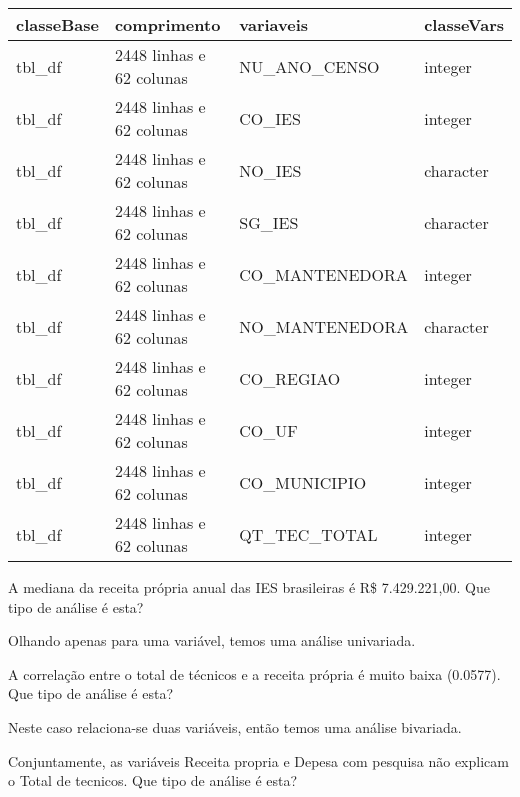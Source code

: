 \documentclass[12pt,]{style/krantz}
\theoremstyle{definition}
\theoremstyle{definition}
\theoremstyle{definition}
\theoremstyle{remark}
\let\BeginKnitrBlock\begin \let\EndKnitrBlock\end
\begin{document}
\begin{table}[!h]
\centering
\begin{tabular}{llll}
\toprule
classeBase & comprimento & variaveis & classeVars\\
\midrule
tbl\_df & 2448 linhas e 62 colunas & NU\_ANO\_CENSO & integer\\
tbl\_df & 2448 linhas e 62 colunas & CO\_IES & integer\\
tbl\_df & 2448 linhas e 62 colunas & NO\_IES & character\\
tbl\_df & 2448 linhas e 62 colunas & SG\_IES & character\\
tbl\_df & 2448 linhas e 62 colunas & CO\_MANTENEDORA & integer\\
\addlinespace
tbl\_df & 2448 linhas e 62 colunas & NO\_MANTENEDORA & character\\
tbl\_df & 2448 linhas e 62 colunas & CO\_REGIAO & integer\\
tbl\_df & 2448 linhas e 62 colunas & CO\_UF & integer\\
tbl\_df & 2448 linhas e 62 colunas & CO\_MUNICIPIO & integer\\
tbl\_df & 2448 linhas e 62 colunas & QT\_TEC\_TOTAL & integer\\
\bottomrule
\end{tabular}
\end{table}

\BeginKnitrBlock{exercise}
\protect\hypertarget{exr:unnamed-chunk-25}{}{\label{exr:unnamed-chunk-25} }A
mediana da receita própria anual das IES brasileiras é R\$ 7.429.221,00.
Que tipo de análise é esta?
\EndKnitrBlock{exercise}

\BeginKnitrBlock{solution}
\iffalse{} {Solução. } \fi{}Olhando apenas para uma variável, temos uma
análise univariada.
\EndKnitrBlock{solution}

\BeginKnitrBlock{exercise}
\protect\hypertarget{exr:unnamed-chunk-27}{}{\label{exr:unnamed-chunk-27} }A
correlação entre o total de técnicos e a receita própria é muito baixa
(0.0577). Que tipo de análise é esta?
\EndKnitrBlock{exercise}

\BeginKnitrBlock{solution}
\iffalse{} {Solução. } \fi{}Neste caso relaciona-se duas variáveis,
então temos uma análise bivariada.
\EndKnitrBlock{solution}

\BeginKnitrBlock{exercise}
\protect\hypertarget{exr:unnamed-chunk-29}{}{\label{exr:unnamed-chunk-29}
}Conjuntamente, as variáveis Receita propria e Depesa com pesquisa não
explicam o Total de tecnicos. Que tipo de análise é esta?
\EndKnitrBlock{exercise}
\end{document}
